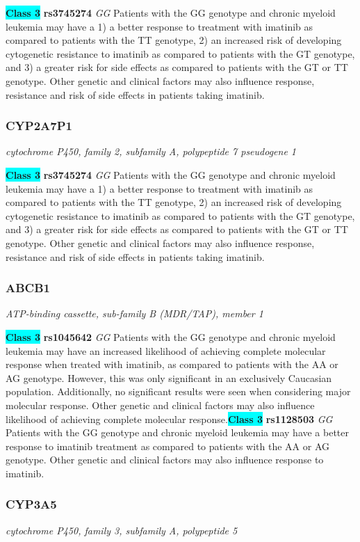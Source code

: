 \documentclass{report}
\begin{document}
\textbf{\colorbox{cyan} {Class 3}} \textbf{ rs3745274 } \textit{ GG }
Patients with the GG genotype and chronic myeloid leukemia may have a 1) a better response to treatment with imatinib as compared to patients with the TT genotype, 2) an increased risk of developing cytogenetic resistance to imatinib as compared to patients with the GT genotype, and 3) a greater risk for side effects as compared to patients with the GT or TT genotype. Other genetic and clinical factors may also influence response, resistance and risk of side effects in patients taking imatinib.\newline\subsubsection{ CYP2A7P1 }
\textit{ cytochrome P450, family 2, subfamily A, polypeptide 7 pseudogene 1 }

\textbf{\colorbox{cyan} {Class 3}} \textbf{ rs3745274 } \textit{ GG }
Patients with the GG genotype and chronic myeloid leukemia may have a 1) a better response to treatment with imatinib as compared to patients with the TT genotype, 2) an increased risk of developing cytogenetic resistance to imatinib as compared to patients with the GT genotype, and 3) a greater risk for side effects as compared to patients with the GT or TT genotype. Other genetic and clinical factors may also influence response, resistance and risk of side effects in patients taking imatinib.\newline\subsubsection{ ABCB1 }
\textit{ ATP-binding cassette, sub-family B (MDR/TAP), member 1 }

\textbf{\colorbox{cyan} {Class 3}} \textbf{ rs1045642 } \textit{ GG }
Patients with the GG genotype and chronic myeloid leukemia may have an increased likelihood of achieving complete molecular response when treated with imatinib, as compared to patients with the AA or AG genotype. However, this was only significant in an exclusively Caucasian population. Additionally, no significant results were seen when considering major molecular response. Other genetic and clinical factors may also influence likelihood of achieving complete molecular response.\newline\textbf{\colorbox{cyan} {Class 3}} \textbf{ rs1128503 } \textit{ GG }
Patients with the GG genotype and chronic myeloid leukemia may have a better response to imatinib treatment as compared to patients with the AA or AG genotype. Other genetic and clinical factors may also influence response to imatinib. \newline\subsubsection{ CYP3A5 }
\textit{ cytochrome P450, family 3, subfamily A, polypeptide 5 }
\end{document}
